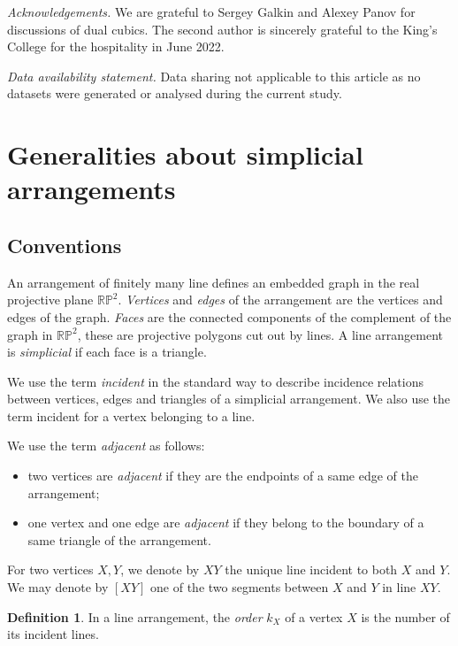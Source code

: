 \documentclass[a4paper,11pt,reqno]{amsart}
\theoremstyle{definition}
\newtheorem{defn}[thm]{Definition}
\theoremstyle{remark}
\theoremstyle{definition}
\theoremstyle{definition}
\theoremstyle{definition}
\numberwithin{equation}{section}
\begin{document}
\emph {Acknowledgements.} We are grateful to Sergey Galkin and Alexey Panov for discussions of dual cubics. The second author is sincerely grateful to the King's College for the hospitality in June 2022.\newline

\emph {Data availability statement.} Data sharing not applicable to this article as no datasets were generated or analysed during the current study.

\section{Generalities about simplicial arrangements}\label{sec:generalities}

\subsection{Conventions}

An arrangement of finitely many line defines an embedded graph in the real projective plane $\mathbb{RP}^{2}$. {\it Vertices} and {\it edges} of the arrangement are the vertices and edges of the graph. {\it Faces} are the connected components of the complement of the graph in $\mathbb{RP}^{2}$, these are projective polygons cut out by lines. A line arrangement is \textit{simplicial} if each face is a triangle.\newline

We use the term \textit{incident} in the standard way to describe incidence relations between vertices, edges and triangles of a simplicial arrangement. We also use the term incident for a vertex belonging to a line.
\par
We use the term \textit{adjacent} as follows:
\begin{itemize}
\item two vertices are \textit{adjacent} if they are the endpoints of a same edge of the arrangement;
\item one vertex and one edge are \textit{adjacent} if they belong to the boundary of a same triangle of the arrangement.
\end{itemize}

For two vertices $X,Y$, we denote by $XY$ the unique line incident to both $X$ and $Y$. We may denote by $[XY]$ one of the two segments between $X$ and $Y$ in line $XY$.

\begin{defn}
In a line arrangement, the \textit{order} $k_{X}$ of a vertex $X$ is the number of its incident lines.
\end{defn}
\end{document}
